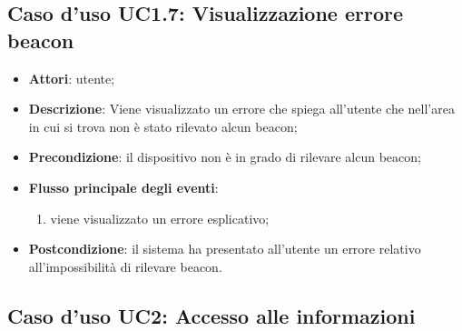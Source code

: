 \documentclass[../AnalisiDeiRequisiti.tex]{subfiles}
\begin{document}
\subsection{Caso d'uso UC1.7: Visualizzazione errore beacon}
\begin{itemize}
	\item \textbf{Attori}: utente;
	\item \textbf{Descrizione}: Viene visualizzato un errore che spiega all'utente che nell'area in cui si trova non è stato rilevato alcun beacon; 
	\item \textbf{Precondizione}: il dispositivo non è in grado di rilevare alcun beacon;
	
	\item \textbf{Flusso principale degli eventi}:
	\begin{enumerate}
		\item viene visualizzato un errore esplicativo;
		
	\end{enumerate}
	\item \textbf{Postcondizione}: il sistema ha presentato all'utente un errore relativo all'impossibilità di rilevare beacon.
\end{itemize}
\hypertarget{UC2}{}
\subsection{Caso d'uso UC2: Accesso alle informazioni}
\end{document}
